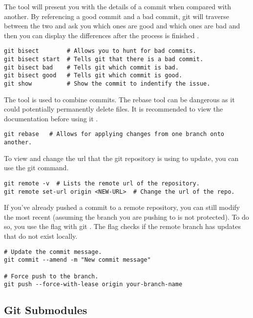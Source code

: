 The  tool will present you with the details of a commit when compared with another. By referencing a good commit and a bad commit, git will traverse between the two and ask you which ones are good and which ones are bad and then you can display the differences after the process is finished \cite{git}\cite{git: Advanced}.
\begin{lstlisting}[style=terminalstyle]
git bisect        # Allows you to hunt for bad commits.
git bisect start  # Tells git that there is a bad commit.
git bisect bad    # Tells git which commit is bad.
git bisect good   # Tells git which commit is good.
git show          # Show the commit to indentify the issue.
\end{lstlisting}

The  tool is used to combine commits. The rebase tool can be dangerous as it could potentially permanently delete files. It is recommended to view the documentation before using it \cite{git}\cite{git: Advanced}.
\begin{lstlisting}[style=terminalstyle]
git rebase   # Allows for applying changes from one branch onto another.
\end{lstlisting}

To view and change the url that the git repository is using to update, you can use the git  command.
\begin{lstlisting}[style=terminalstyle]
git remote -v  # Lists the remote url of the repository.
git remote set-url origin <NEW-URL>  # Change the url of the repo.
\end{lstlisting}

If you've already pushed a commit to a remote repository, you can still modify the most recent  (assuming the branch you are pushing to is not protected). To do so, you use the  flag with git . The  flag checks if the remote branch has updates that do not exist locally.
\begin{lstlisting}[style=terminalstyle]
# Update the commit message.
git commit --amend -m "New commit message"

# Force push to the branch. 
git push --force-with-lease origin your-branch-name
\end{lstlisting} 










\subsection{Git Submodules}

